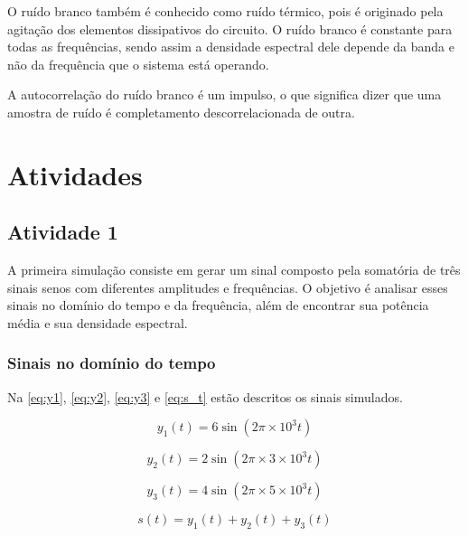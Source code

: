 \documentclass[11pt]{classes/ifscarticle}
\begin{document}
O ruído branco também é conhecido como ruído térmico, pois é originado pela agitação dos elementos dissipativos do circuito. O ruído branco é constante para todas as frequências, sendo assim a densidade espectral dele depende da banda e não da frequência que o sistema está operando. 

A autocorrelação do ruído branco é um impulso, o que significa dizer que uma amostra de ruído é completamento descorrelacionada de outra.

\section{Atividades}
\label{sec:atividades}



\subsection{Atividade 1}
\label{sec:A1}

A primeira simulação consiste em gerar um sinal composto pela somatória de três sinais senos com diferentes amplitudes e frequências.
O objetivo é analisar esses sinais no domínio do tempo e da frequência, além de encontrar sua potência média e sua densidade espectral. 

\subsubsection{Sinais no domínio do tempo}
Na \autoref{eq:y1}, \autoref{eq:y2}, \autoref{eq:y3} e \autoref{eq:s_t} estão descritos os sinais simulados.


 \begin{equation}
    y_1(t) = 6 \sin (2\pi\times10^3t)
     \label{eq:y1}
 \end{equation}

 \begin{equation}
    y_2(t) = 2 \sin (2\pi\times3\times10^3t)
     \label{eq:y2}
 \end{equation}
 
  \begin{equation}
    y_3(t) = 4 \sin (2\pi\times5\times10^3t)
     \label{eq:y3}
 \end{equation}
 
  \begin{equation}
     s(t) = y_1(t) + y_2(t) + y_3(t)
     \label{eq:s_t}
 \end{equation}
\end{document}
